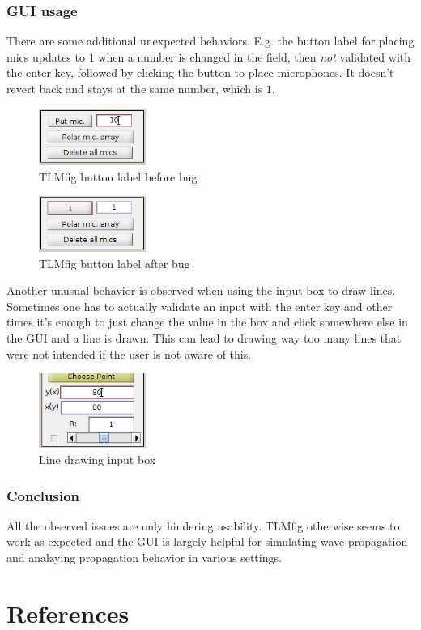 \documentclass[twocolumn]{article}
\begin{document}
\subsubsection{GUI usage}
There are some additional unexpected behaviors.
E.g. the button label for placing mics updates to $1$ when a number is changed in the field,
then \textit{not} validated with the enter key, followed by clicking the button to place microphones.
It doesn't revert back and stays at the same number, which is $1$.

\begin{figure}[H]
    \centering
    \includegraphics[width=35mm]{./Images/tlm_fig_button_label_good.png}
    \caption{TLMfig button label before bug}
\end{figure}
\begin{figure}[H]
    \centering
    \includegraphics[width=35mm]{./Images/tlm_fig_button_label_bad.png}
    \caption{TLMfig button label after bug}
\end{figure}

Another unusual behavior is observed when using the input box to draw lines.
Sometimes one has to actually validate an input with the enter key and other times
it's enough to just change the value in the box and click somewhere else in the GUI
and a line is drawn.
This can lead to drawing way too many lines that were not intended if the user is not
aware of this.

\begin{figure}[H]
    \centering
    \includegraphics[width=35mm]{./Images/tlm_fig_updating_lines.png}
    \caption{Line drawing input box}
\end{figure}

\subsubsection{Conclusion}
All the observed issues are only hindering usability.
TLMfig otherwise seems to work as expected and the GUI is largely helpful
for simulating wave propagation and analzying propagation behavior in
various settings.


\section{References}

\small


\end{document}
